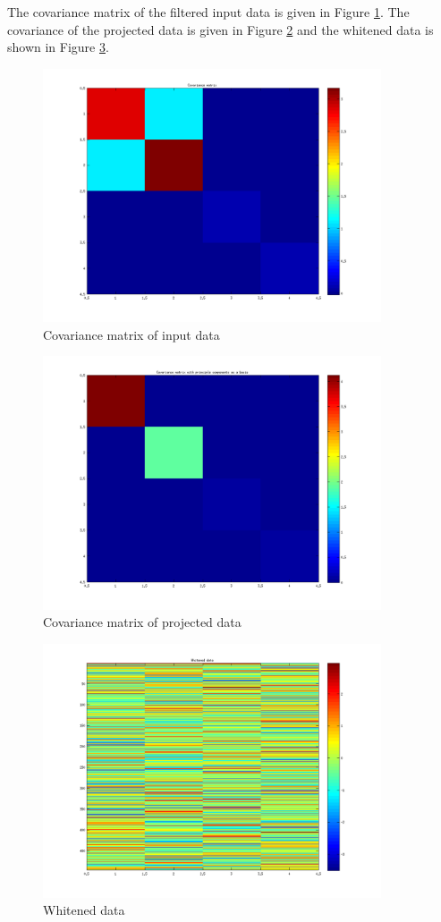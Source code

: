 \documentclass{article}
\begin{document}
		The covariance matrix of the filtered input data is given in Figure \ref{fig:task2Covariance}. 
		The covariance of the projected data is given in Figure \ref{fig:task2Eigenvalues} and the whitened data is shown in Figure \ref{fig:task2WhitenedData}.
		
		\begin{figure}[H]
			\centering
			\includegraphics[width=10cm]{task2Covariance.png}
			\caption{Covariance matrix of input data}
			\label{fig:task2Covariance}
		\end{figure}
		
		
		\begin{figure}[H]
			\centering
			\includegraphics[width=10cm]{task2Eigenvalues.png}
			\caption{Covariance matrix of projected data}
			\label{fig:task2Eigenvalues}
		\end{figure}
		
		\begin{figure}[ht!]
			\centering
			\includegraphics[width=10cm]{task2WhitenedData.png}
			\caption{Whitened data}
			\label{fig:task2WhitenedData}
		\end{figure}
		
\end{document}

